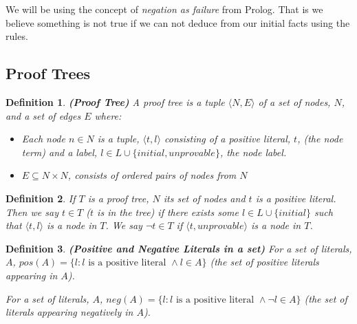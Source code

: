 \documentclass{blue-book}
\newtheorem{definition}{Definition}
\begin{document}
We will be using the concept of \emph{negation as failure} from Prolog.  That is we believe something is not true if we can not deduce from our initial facts using the rules.

\subsection{Proof Trees}

\begin{definition}{\bf (Proof Tree)}
A proof tree is a tuple $\langle N, E \rangle$ of a set of nodes, $N$, and a set of edges $E$ where:
\begin{itemize}
\item Each node $n \in N$ is a tuple, $\langle t, l\rangle$ consisting of a positive literal, $t$, (the \emph{node term}) and a label, $l \in L \cup \{initial, unprovable\}$, the \emph{node label}.
\item $E \subseteq N \times N$, consists of ordered pairs of nodes from $N$
\end{itemize}
\end{definition}


\begin{definition}
If $T$ is a proof tree, $N$ its set of nodes and $t$ is a positive literal.  Then we say $t \in T$ ($t$ is in the tree) if there exists some $l \in L \cup \{initial\}$ such that $\langle t, l \rangle$ is a node in $T$.  We say $\neg t \in T$ if $\langle t, unprovable \rangle$ is a node in $T$.
\end{definition}

\begin{definition}{\bf (Positive and Negative Literals in a set)}
For a set of literals, $A$, $pos(A) = \{l: l \text{ is a positive literal } \wedge l \in A\}$ (the set of positive literals appearing in $A$).

For a set of literals, $A$, $neg(A) = \{l: l \text{ is a positive literal } \wedge \neg l \in A\}$ (the set of literals appearing negatively in $A$).
\end{definition}
\end{document}

